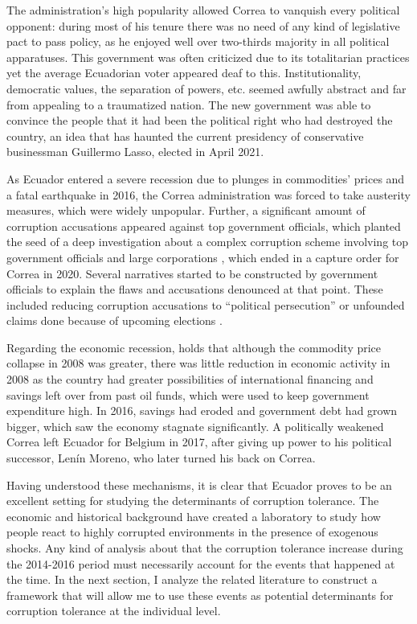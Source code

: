 \documentclass[12pt,a4]{article}\usepackage[]{graphicx}\usepackage[]{xcolor}
\begin{document}
The administration's high popularity allowed Correa to vanquish every political opponent: during most of his tenure there was no need of any kind of legislative pact to pass policy, as he enjoyed well over two-thirds majority in all political apparatuses. This government was often criticized due to its totalitarian practices yet the average Ecuadorian voter appeared deaf to this. Institutionality, democratic values, the separation of powers, etc. seemed awfully abstract and far from appealing to a traumatized nation. The new government was able to convince the people that it had been the political right who had destroyed the country, an idea that has haunted the current presidency of conservative businessman Guillermo Lasso, elected in April 2021.

As Ecuador entered a severe recession due to plunges in commodities’ prices and a fatal earthquake in 2016, the Correa administration was forced to take austerity measures, which were widely unpopular. Further, a significant amount of corruption accusations appeared against top government officials, which planted the seed of a deep investigation about a complex corruption scheme involving top government officials and large corporations \parencite{Villavicencio.2019}, which ended in a capture order for Correa in 2020. Several narratives started to be constructed by government officials to explain the flaws and accusations denounced at that point. These included reducing corruption accusations to \enquote{political persecution} or unfounded claims done because of upcoming elections \parencite{Melendez.2017}. 

Regarding the economic recession, \textcite{Orozco.2015} holds that although the commodity price collapse in 2008 was greater, there was little reduction in economic activity in 2008 as the country had greater possibilities of international financing and savings left over from past oil funds, which were used to keep government expenditure high. In 2016, savings had eroded and government debt had grown bigger, which saw the economy stagnate significantly. A politically weakened Correa left Ecuador for Belgium in 2017, after giving up power to his political successor, Lenín Moreno, who later turned his back on Correa.

Having understood these mechanisms, it is clear that Ecuador proves to be an excellent setting for studying the determinants of corruption tolerance. The economic and historical background have created a laboratory to study how people react to highly corrupted environments in the presence of exogenous shocks. Any kind of analysis about that the corruption tolerance increase during the 2014-2016 period must necessarily account for the events that happened at the time. In the next section, I analyze the related literature to construct a framework that will allow me to use these events as potential determinants for corruption tolerance at the individual level. 
\end{document}
